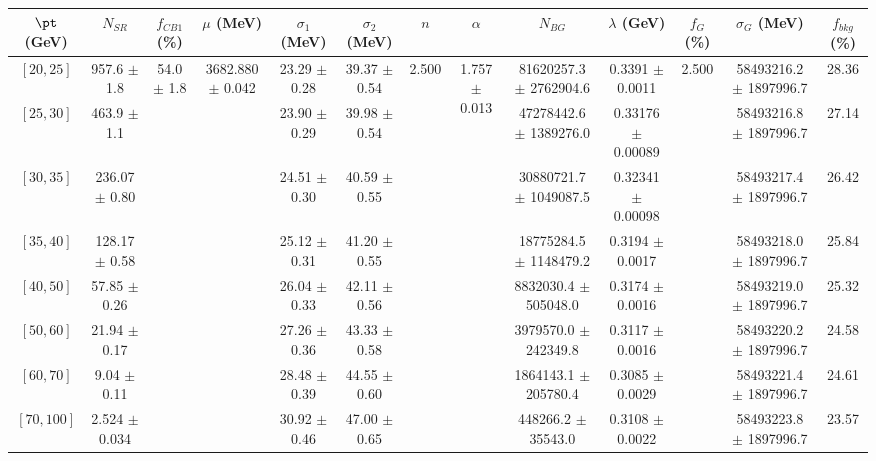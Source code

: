 \begin{tabular}{c||c|c|c|c|c|c|c|c|c|c|c||c}
$\pt$ (GeV) & $N_{SR}$ & $f_{CB1}$ (\%) & $\mu$ (MeV) & $\sigma_1$ (MeV) & $\sigma_2$ (MeV) & $n$ & $\alpha$ & $N_{BG}$ & $\lambda$ (GeV) & $f_G$ (\%) & $\sigma_G$ (MeV) & $f_{bkg}$ (\%) \\
\hline
$[20, 25]$ & 957.6 $\pm$ 1.8 & \multirow{8}{*}{54.0 $\pm$ 1.8} & \multirow{8}{*}{3682.880 $\pm$ 0.042} & 23.29 $\pm$ 0.28 & 39.37 $\pm$ 0.54 & \multirow{8}{*}{2.500} & \multirow{8}{*}{1.757 $\pm$ 0.013} & 81620257.3 $\pm$ 2762904.6 & 0.3391 $\pm$ 0.0011 & \multirow{8}{*}{2.500} & 58493216.2 $\pm$ 1897996.7 & 28.36\\
$[25, 30]$ & 463.9 $\pm$ 1.1 &  &  & 23.90 $\pm$ 0.29 & 39.98 $\pm$ 0.54 &  &  & 47278442.6 $\pm$ 1389276.0 & 0.33176 $\pm$ 0.00089 &  & 58493216.8 $\pm$ 1897996.7 & 27.14\\
$[30, 35]$ & 236.07 $\pm$ 0.80 &  &  & 24.51 $\pm$ 0.30 & 40.59 $\pm$ 0.55 &  &  & 30880721.7 $\pm$ 1049087.5 & 0.32341 $\pm$ 0.00098 &  & 58493217.4 $\pm$ 1897996.7 & 26.42\\
$[35, 40]$ & 128.17 $\pm$ 0.58 &  &  & 25.12 $\pm$ 0.31 & 41.20 $\pm$ 0.55 &  &  & 18775284.5 $\pm$ 1148479.2 & 0.3194 $\pm$ 0.0017 &  & 58493218.0 $\pm$ 1897996.7 & 25.84\\
$[40, 50]$ & 57.85 $\pm$ 0.26 &  &  & 26.04 $\pm$ 0.33 & 42.11 $\pm$ 0.56 &  &  & 8832030.4 $\pm$ 505048.0 & 0.3174 $\pm$ 0.0016 &  & 58493219.0 $\pm$ 1897996.7 & 25.32\\
$[50, 60]$ & 21.94 $\pm$ 0.17 &  &  & 27.26 $\pm$ 0.36 & 43.33 $\pm$ 0.58 &  &  & 3979570.0 $\pm$ 242349.8 & 0.3117 $\pm$ 0.0016 &  & 58493220.2 $\pm$ 1897996.7 & 24.58\\
$[60, 70]$ & 9.04 $\pm$ 0.11 &  &  & 28.48 $\pm$ 0.39 & 44.55 $\pm$ 0.60 &  &  & 1864143.1 $\pm$ 205780.4 & 0.3085 $\pm$ 0.0029 &  & 58493221.4 $\pm$ 1897996.7 & 24.61\\
$[70, 100]$ & 2.524 $\pm$ 0.034 &  &  & 30.92 $\pm$ 0.46 & 47.00 $\pm$ 0.65 &  &  & 448266.2 $\pm$ 35543.0 & 0.3108 $\pm$ 0.0022 &  & 58493223.8 $\pm$ 1897996.7 & 23.57\\
\end{tabular}

